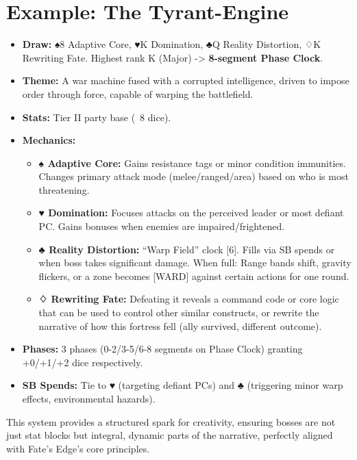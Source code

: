 \section{Example: The Tyrant-Engine}

\begin{itemize}
    \item \textbf{Draw:} ♠8 Adaptive Core, ♥K Domination, ♣Q Reality Distortion, ♢K Rewriting Fate. Highest rank K (Major) -> \textbf{8-segment Phase Clock}.
    \item \textbf{Theme:} A war machine fused with a corrupted intelligence, driven to impose order through force, capable of warping the battlefield.
    \item \textbf{Stats:} Tier II party base (~8 dice).
    \item \textbf{Mechanics:}
    \begin{itemize}
        \item \textbf{♠ Adaptive Core:} Gains resistance tags or minor condition immunities. Changes primary attack mode (melee/ranged/area) based on who is most threatening.
        \item \textbf{♥ Domination:} Focuses attacks on the perceived leader or most defiant PC. Gains bonuses when enemies are impaired/frightened.
        \item \textbf{♣ Reality Distortion:} ``Warp Field'' clock [6]. Fills via SB spends or when boss takes significant damage. When full: Range bands shift, gravity flickers, or a zone becomes [WARD] against certain actions for one round.
        \item \textbf{♢ Rewriting Fate:} Defeating it reveals a command code or core logic that can be used to control other similar constructs, or rewrite the narrative of how this fortress fell (ally survived, different outcome).
    \end{itemize}
    \item \textbf{Phases:} 3 phases (0-2/3-5/6-8 segments on Phase Clock) granting +0/+1/+2 dice respectively.
    \item \textbf{SB Spends:} Tie to ♥ (targeting defiant PCs) and ♣ (triggering minor warp effects, environmental hazards).
\end{itemize}

This system provides a structured spark for creativity, ensuring bosses are not just stat blocks but integral, dynamic parts of the narrative, perfectly aligned with Fate's Edge's core principles.
